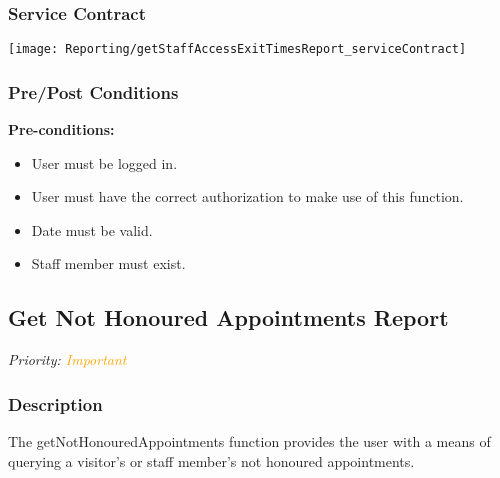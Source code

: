 
\subsubsection{Service Contract}
\texttt{[image: Reporting/getStaffAccessExitTimesReport\_serviceContract]}
\subsubsection{Pre/Post Conditions}		
	\textbf{Pre-conditions:}
	\begin{itemize}
		\item User must be logged in.
		\item User must have the correct authorization to make use of this function.
		\item Date must be valid.
		\item Staff member must exist.
	\end{itemize}

\subsection{Get Not Honoured Appointments Report}
\textit{Priority: \textcolor{orange}{Important}}

\subsubsection{Description}
The getNotHonouredAppointments function provides the user with a means of querying a visitor's or staff member's not honoured appointments.

		
